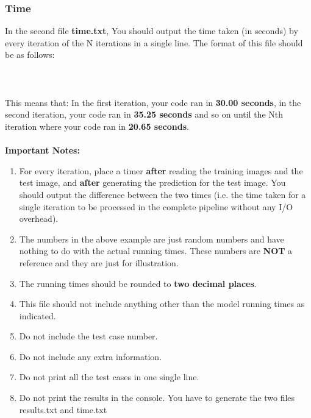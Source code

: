 \documentclass[12pt]{article}
\begin{document}
\subsubsection{Time}
In the second file \textbf{time.txt}, You should output the time taken (in seconds) by every iteration of the N iterations in a single line.
\newpage
The format of this file should be as follows:\\\\
\noindent{}
\\\\
This means that: In the first iteration, your code ran in \textbf{30.00 seconds},
in the second iteration, your code ran in \textbf{35.25 seconds} and so on until the Nth iteration where your code ran in \textbf{20.65 seconds}.
\\\\
\textbf{Important Notes:}
\begin{enumerate}
    \item For every iteration, place a timer \textbf{after} reading the training images and the test image, and \textbf{after} generating the prediction for the test image. You should output the difference between the two times (i.e. the time taken for a single iteration to be processed in the complete pipeline without any I/O overhead).
    \item The numbers in the above example are just random numbers and have nothing to do with the actual running times. These numbers are \textbf{NOT} a reference and they are just for illustration.
    \item The running times should be rounded to \textbf{two decimal places}.
    \item This file should not include anything other than the model running times as indicated.
    \item Do not include the test case number.
    \item Do not include any extra information.
    \item Do not print all the test cases in one single line.
    \item Do not print the results in the console. You have to generate the two files results.txt and time.txt
    
\end{enumerate}
\end{document}
